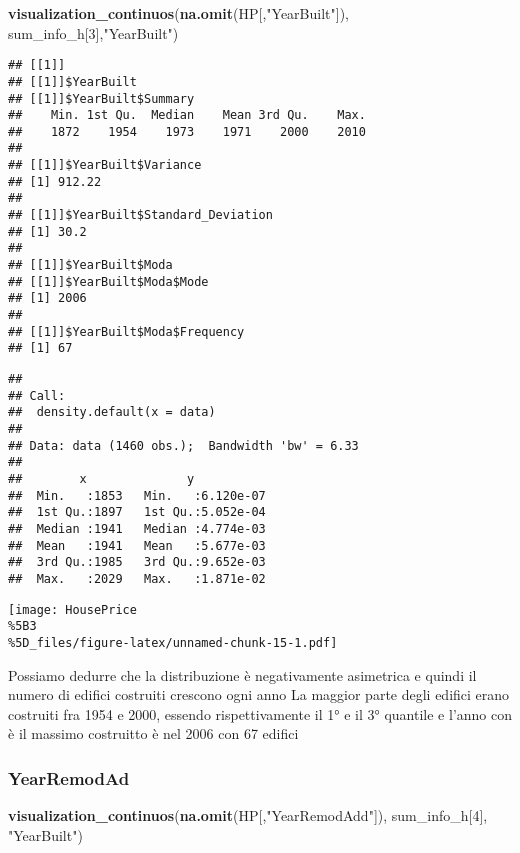 \documentclass[
]{article}
\newenvironment{Shaded}{\begin{snugshade}}{\end{snugshade}}
\newcommand{\DecValTok}[1]{\textcolor[rgb]{0.00,0.00,0.81}{#1}}
\newcommand{\FunctionTok}[1]{\textcolor[rgb]{0.13,0.29,0.53}{\textbf{#1}}}
\newcommand{\NormalTok}[1]{#1}
\newcommand{\StringTok}[1]{\textcolor[rgb]{0.31,0.60,0.02}{#1}}
\begin{document}
\begin{Shaded}
\begin{Highlighting}[]
\FunctionTok{visualization\_continuos}\NormalTok{(}\FunctionTok{na.omit}\NormalTok{(HP[,}\StringTok{"YearBuilt"}\NormalTok{]), sum\_info\_h[}\DecValTok{3}\NormalTok{],}\StringTok{"YearBuilt"}\NormalTok{)}
\end{Highlighting}
\end{Shaded}

\begin{verbatim}
## [[1]]
## [[1]]$YearBuilt
## [[1]]$YearBuilt$Summary
##    Min. 1st Qu.  Median    Mean 3rd Qu.    Max. 
##    1872    1954    1973    1971    2000    2010 
## 
## [[1]]$YearBuilt$Variance
## [1] 912.22
## 
## [[1]]$YearBuilt$Standard_Deviation
## [1] 30.2
## 
## [[1]]$YearBuilt$Moda
## [[1]]$YearBuilt$Moda$Mode
## [1] 2006
## 
## [[1]]$YearBuilt$Moda$Frequency
## [1] 67
\end{verbatim}

\begin{verbatim}
## 
## Call:
##  density.default(x = data)
## 
## Data: data (1460 obs.);  Bandwidth 'bw' = 6.33
## 
##        x              y            
##  Min.   :1853   Min.   :6.120e-07  
##  1st Qu.:1897   1st Qu.:5.052e-04  
##  Median :1941   Median :4.774e-03  
##  Mean   :1941   Mean   :5.677e-03  
##  3rd Qu.:1985   3rd Qu.:9.652e-03  
##  Max.   :2029   Max.   :1.871e-02
\end{verbatim}

\texttt{[image: HousePrice\\\%5B3\\\%5D\_files/figure-latex/unnamed-chunk-15-1.pdf]}

Possiamo dedurre che la distribuzione è negativamente asimetrica e
quindi il numero di edifici costruiti crescono ogni anno La maggior
parte degli edifici erano costruiti fra 1954 e 2000, essendo
rispettivamente il 1° e il 3° quantile e l'anno con è il massimo
costruitto è nel 2006 con 67 edifici

\subsubsection{YearRemodAd}\label{yearremodad}

\begin{Shaded}
\begin{Highlighting}[]
\FunctionTok{visualization\_continuos}\NormalTok{(}\FunctionTok{na.omit}\NormalTok{(HP[,}\StringTok{"YearRemodAdd"}\NormalTok{]), sum\_info\_h[}\DecValTok{4}\NormalTok{], }\StringTok{"YearBuilt"}\NormalTok{)}
\end{Highlighting}
\end{Shaded}
\end{document}
